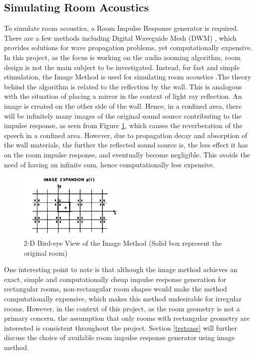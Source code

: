 \documentclass[a4paper,twoside,12pt,hidelinks]{article}
\begin{document}
\subsection{Simulating Room Acoustics}
To simulate room acoustics, a Room Impulse Response generator is required. There are a few methods including Digital Waveguide Mesh (DWM) \cite{Murphy2008HybridSimulation}, which provides solutions for wave propagation problems, yet computationally expensive. In this project, as the focus is working on the audio zooming algorithm, room design is not the main subject to be investigated. Instead, for fast and simple stimulation, the Image Method is used for simulating room acoustics \cite{Allen1979ImageAcoustics}.The theory behind the algorithm is related to the reflection by the wall. This is analogous with the situation of placing a mirror in the context of light ray reflection. An image is created on the other side of the wall. Hence, in a confined area, there will be infinitely many images of the original sound source contributing to the impulse response, as seen from Figure \ref{fig:imagemethod}, which causes the reverberation of the speech in a confined area. However, due to propagation decay and absorption of the wall materials, the further the reflected sound source is, the less effect it has on the room impulse response, and eventually become negligible. This avoids the need of having an infinite sum, hence computationally less expensive.

\begin{figure}[H]
\begin{center}
\includegraphics[width=0.45\textwidth]{imagemethod}
\end{center}
\caption{2-D Bird-eye View of the Image Method (Solid box represent the original room) \cite{Allen1979ImageAcoustics}}
\label{fig:imagemethod}
\end{figure}

One interesting point to note is that although the image method achieves an exact, simple and computationally cheap impulse response generation for rectangular rooms, non-rectangular room shapes would make the method computationally expensive, which makes this method undesirable for irregular rooms. However, in the context of this project, as the room geometry is not a primary concern, the assumption that only rooms with rectangular geometry are interested is consistent throughout the project. Section \ref{testcase} will further discuss the choice of available room impulse response generator using image method.
\end{document}
